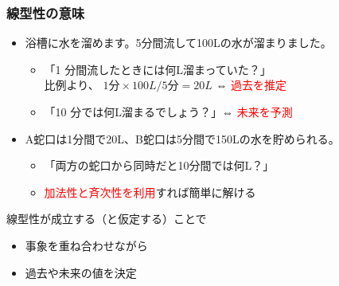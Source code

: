 \documentclass[unicode,12pt,aspectratio=169]{beamer}
\begin{document}
\begin{frame}
	\frametitle{線型性の意味}
		\begin{itemize}
			\item 浴槽に水を溜めます。5分間流して100Lの水が溜まりました。
			\begin{itemize}
				\item 「1 分間流したときには何L溜まっていた？」\\
				比例より、 $1 \text{分} \times 100 L /5 \text{分}= 20 L$ ⇔ \textcolor{red}{過去を推定}
				\item「10 分では何L溜まるでしょう？」⇔ \textcolor{red}{未来を予測}
			\end{itemize}
			\item A蛇口は1分間で20L、B蛇口は5分間で150Lの水を貯められる。
			\begin{itemize}
				\item 「両方の蛇口から同時だと10分間では何L？」
				\item \textcolor{red}{加法性と斉次性を利用}すれば簡単に解ける
			\end{itemize}
		\end{itemize}
		\centering
		\begin{minipage}{.7\textwidth}
			\begin{itembox}[l]{線型性が成立する（と仮定する）ことで}
			\begin{itemize}
				\item 事象を重ね合わせながら
				\item 過去や未来の値を決定
			\end{itemize}
		\end{itembox}
		\end{minipage}
\end{frame}
\end{document}
